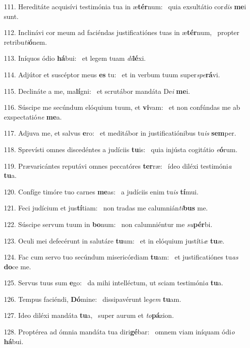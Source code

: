 111. Hereditáte acquisívi testimónia tua in æ\textbf{tér}num: \ast\  quia exsultátio cor\textit{dis} \textbf{me}i sunt.\

112. Inclinávi cor meum ad faciéndas justificatiónes tuas in æ\textbf{tér}num, \ast\  propter retribu\textit{ti}\textbf{ó}nem.\

113. Iníquos ódio \textbf{há}bui: \ast\  et legem tuam \textit{di}\textbf{lé}xi.\

114. Adjútor et suscéptor meus \textbf{es} tu: \ast\  et in verbum tuum super\textit{spe}\textbf{rá}vi.\

115. Declináte a me, ma\textbf{lí}gni: \ast\  et scrutábor mandáta De\textit{i} \textbf{me}i.\

116. Súscipe me secúndum elóquium tuum, et \textbf{vi}vam: \ast\  et non confúndas me ab exspectatió\textit{ne} \textbf{me}a.\

117. Adjuva me, et salvus \textbf{e}ro: \ast\  et meditábor in justificatiónibus tu\textit{is} \textbf{sem}per.\

118. Sprevísti omnes discedéntes a judíciis \textbf{tu}is: \ast\  quia injústa cogitátio \textit{e}\textbf{ó}rum.\

119. Prævaricántes reputávi omnes peccatóres \textbf{ter}ræ: \ast\  ídeo diléxi testimóni\textit{a} \textbf{tu}a.\

120. Confíge timóre tuo carnes \textbf{me}as: \ast\  a judíciis enim tu\textit{is} \textbf{tí}mui.\

121. Feci judícium et jus\textbf{tí}tiam: \ast\  non tradas me calumnián\textit{ti}\textbf{bus} me.\

122. Súscipe servum tuum in \textbf{bo}num: \ast\  non calumniéntur me \textit{su}\textbf{pér}bi.\

123. Oculi mei defecérunt in salutáre \textbf{tu}um: \ast\  et in elóquium justíti\textit{æ} \textbf{tu}æ.\

124. Fac cum servo tuo secúndum misericórdiam \textbf{tu}am: \ast\  et justificatiónes tu\textit{as} \textbf{do}ce me.\

125. Servus tuus sum \textbf{e}go: \ast\  da mihi intelléctum, ut sciam testimóni\textit{a} \textbf{tu}a.\

126. Tempus faciéndi, \textbf{Dó}mine: \ast\  dissipavérunt le\textit{gem} \textbf{tu}am.\

127. Ideo diléxi mandáta \textbf{tu}a, \ast\  super aurum et \textit{to}\textbf{pá}zion.\

128. Proptérea ad ómnia mandáta tua diri\textbf{gé}bar: \ast\  omnem viam iníquam ódi\textit{o} \textbf{há}bui.\

